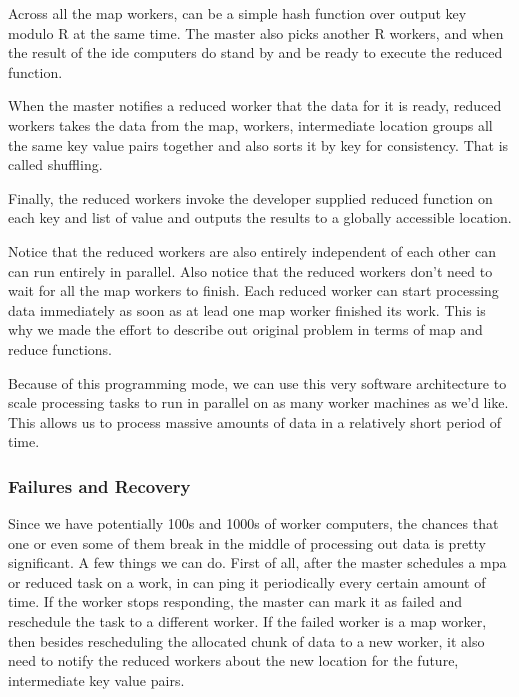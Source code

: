 \documentclass[a4paper, 11pt]{book}
\begin{document}
    Across all the map workers, can be a simple hash function over output key modulo R at the same time.
    The master also picks another R workers, and when the result of the ide computers do stand by and be ready to execute the reduced function.

    When the master notifies a reduced worker that the data for it is ready, reduced workers takes the data from the map, workers, intermediate location groups all the same key value pairs together and also sorts it by key for consistency.
    That is called shuffling.

    Finally, the reduced workers invoke the developer supplied reduced function on each key and list of value and outputs the results to a globally accessible location.

    Notice that the reduced workers are also entirely independent of each other can can run entirely in parallel.
    Also notice that the reduced workers don't need to wait for all the map workers to finish.
    Each reduced worker can start processing data immediately as soon as at lead one map worker finished its work.
    This is why we made the effort to describe out original problem in terms of map and reduce functions.

    Because of this programming mode, we can use this very software architecture to scale processing tasks to run in parallel on as many worker machines as we'd like.
    This allows us to process massive amounts of data in a relatively short period of time.

    \subsubsection{Failures and Recovery}
    Since we have potentially 100s and 1000s of worker computers, the chances that one or even some of them break in the middle of processing out data is pretty significant.
    A few things we can do.
    First of all, after the master schedules a mpa or reduced task on a work, in can ping it periodically every certain amount of time.
    If the worker stops responding, the master can mark it as failed and reschedule the task to a different worker.
    If the failed worker is a map worker, then besides rescheduling the allocated chunk of data to a new worker, it also need to notify the reduced workers about the new location for the future, intermediate key value pairs.
\end{document}
